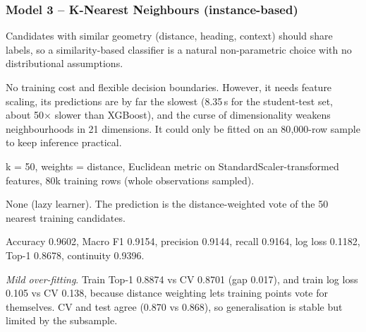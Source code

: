\documentclass[10pt,a4paper]{article}
\newenvironment{qa}{\begin{description}[leftmargin=0pt,labelsep=0.4em,itemsep=2pt,font=\bfseries\color{accent!80!black}]}{\end{description}}
\begin{document}
\subsubsection*{Model 3 -- K-Nearest Neighbours (instance-based)}
\begin{qa}
\item[A1. Why suitable?] Candidates with similar geometry (distance, heading, context) should share labels, so a similarity-based classifier is a natural non-parametric choice with no distributional assumptions.
\item[A2. Strengths / limitations.] No training cost and flexible decision boundaries. However, it needs feature scaling, its predictions are by far the slowest (8.35\,s for the student-test set, about 50$\times$ slower than XGBoost), and the curse of dimensionality weakens neighbourhoods in 21 dimensions. It could only be fitted on an 80{,}000-row sample to keep inference practical.
\item[B5. Hyperparameters.] k = 50, weights = distance, Euclidean metric on StandardScaler-transformed features, 80k training rows (whole observations sampled).
\item[B6. Objective.] None (lazy learner). The prediction is the distance-weighted vote of the 50 nearest training candidates.
\item[C7/C8. Student-test.] Accuracy 0.9602, Macro F1 0.9154, precision 0.9144, recall 0.9164, log loss 0.1182, Top-1 0.8678, continuity 0.9396.
\item[C9. Fit.] \emph{Mild over-fitting}. Train Top-1 0.8874 vs CV 0.8701 (gap 0.017), and train log loss 0.105 vs CV 0.138, because distance weighting lets training points vote for themselves. CV and test agree (0.870 vs 0.868), so generalisation is stable but limited by the subsample.
\end{qa}
\end{document}
